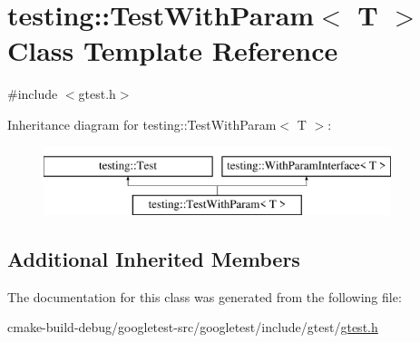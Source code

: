 \hypertarget{classtesting_1_1TestWithParam}{}\section{testing\+::Test\+With\+Param$<$ T $>$ Class Template Reference}
\label{classtesting_1_1TestWithParam}


{\ttfamily \#include $<$gtest.\+h$>$}

Inheritance diagram for testing\+::Test\+With\+Param$<$ T $>$\+:\begin{figure}[H]
\begin{center}
\leavevmode
\includegraphics[height=2.000000cm]{classtesting_1_1TestWithParam}
\end{center}
\end{figure}
\subsection*{Additional Inherited Members}


The documentation for this class was generated from the following file\+:\begin{DoxyCompactItemize}
\item 
cmake-\/build-\/debug/googletest-\/src/googletest/include/gtest/\mbox{\hyperlink{gtest_8h}{gtest.\+h}}\end{DoxyCompactItemize}
